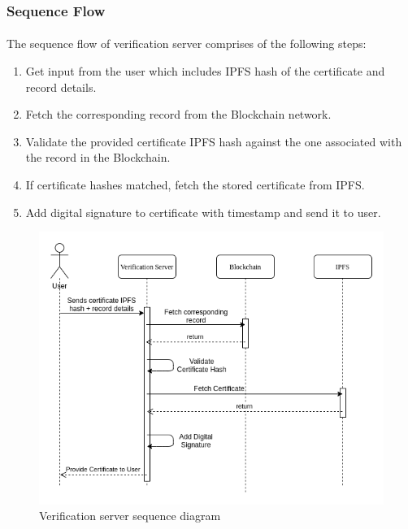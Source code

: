 \documentclass{article}
\begin{document}
        \subsubsection{Sequence Flow}
        \paragraph{}
        The sequence flow of verification server comprises of the following steps:
        \begin{enumerate}
            \item Get input from the user which includes IPFS hash of the certificate and record details.
            \item Fetch the corresponding record from the Blockchain network.
            \item Validate the provided certificate IPFS hash against the one associated with the record in the Blockchain.
            \item If certificate hashes matched, fetch the stored certificate from IPFS.
            \item Add digital signature to certificate with timestamp and send it to user.
        \end{enumerate}
        
        \begin{figure}[H]
                \includegraphics[scale=0.5]{verification_seq.png}
                \centering
                \caption{Verification server sequence diagram}
        \end{figure}
        
\end{document}
